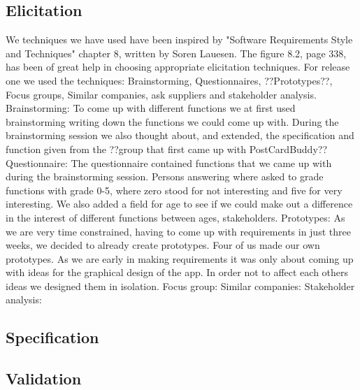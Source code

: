 \documentclass[10pt,a4paper]{article}
\begin{document}
\subsection{Elicitation}
We techniques we have used have been inspired by "Software Requirements Style and Techniques" chapter 8, written by Soren Lauesen. The figure 8.2, page 338, has been of great help in choosing appropriate elicitation techniques.
For release one we used the techniques: Brainstorming, Questionnaires, ??Prototypes??, Focus groups, Similar companies, ask suppliers and stakeholder analysis.
\newline
Brainstorming: To come up with different functions we at first used brainstorming writing down the functions we could come up with. During the brainstorming session we also thought about, and extended, the specification and function given from the ??group that first came up with PostCardBuddy??
\newline
Questionnaire: The questionnaire contained functions that we came up with during the brainstorming session. Persons answering where asked to grade functions with grade 0-5, where zero stood for not interesting and five for very interesting. We also added a field for age to see if we could make out a difference in the interest of different functions between ages, stakeholders.
\newline
Prototypes: As we are very time constrained, having to come up with requirements in just three weeks, we decided to already create prototypes. Four of us made our own prototypes. As we are early in making requirements it was only about coming up with ideas for the graphical design of the app. In order not to affect each others ideas we designed them in isolation.
\newline
Focus group:
\newline
Similar companies:
\newline
Stakeholder analysis:


\subsection{Specification}

\subsection{Validation}
\end{document}
